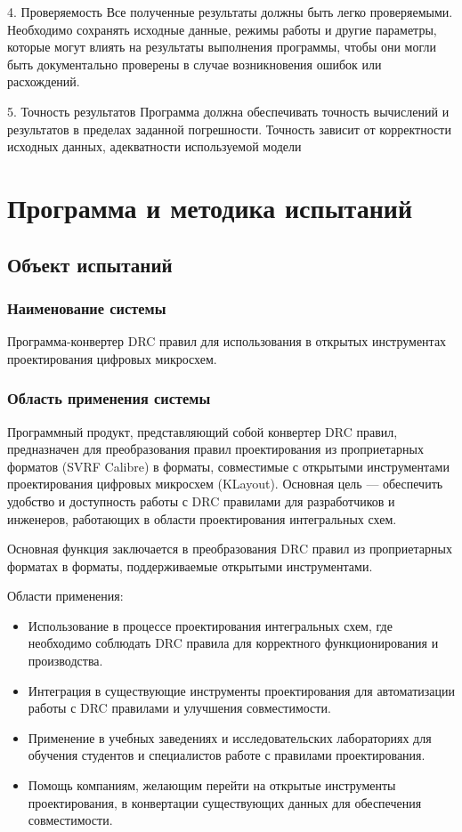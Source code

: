4. Проверяемость
   Все полученные результаты должны быть легко проверяемыми. Необходимо сохранять исходные данные, режимы работы и другие параметры, которые могут влиять на результаты выполнения программы, чтобы они могли быть документально проверены в случае возникновения ошибок или расхождений.

5. Точность результатов
   Программа должна обеспечивать точность вычислений и результатов в пределах заданной погрешности. Точность зависит от корректности исходных данных, адекватности используемой модели

\section{Программа и методика испытаний}

\subsection{Объект испытаний}

\subsubsection{Наименование системы}

Программа-конвертер DRC правил для использования
в открытых инструментах проектирования цифровых микросхем.

\subsubsection{Область применения системы}

Программный продукт, представляющий собой конвертер DRC правил,
предназначен для преобразования правил проектирования
из проприетарных форматов (SVRF Calibre) в форматы, совместимые
с открытыми инструментами проектирования цифровых микросхем (KLayout).
Основная цель --- обеспечить удобство
и доступность работы с DRC правилами для разработчиков и инженеров,
работающих в области проектирования интегральных схем.\par
Основная функция заключается в преобразования DRC правил
из проприетарных форматах в форматы,
поддерживаемые открытыми инструментами.

Области применения:

\begin{itemize}
	\item Использование в процессе проектирования интегральных схем,
		где необходимо соблюдать DRC правила
		для корректного функционирования и производства.
	\item Интеграция в существующие инструменты проектирования
		для автоматизации работы с DRC правилами и улучшения совместимости.
	\item Применение в учебных заведениях
		и исследовательских лабораториях для обучения студентов
		и специалистов работе с правилами проектирования.
	\item Помощь компаниям, желающим перейти
		на открытые инструменты проектирования,
		в конвертации существующих данных для обеспечения совместимости.
\end{itemize}

